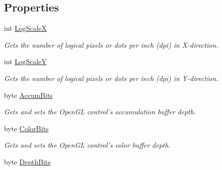 \subsection*{Properties}
\begin{DoxyCompactItemize}
\item 
int \hyperlink{class_tao_1_1_platform_1_1_windows_1_1_simple_open_gl_control_ab14fda5344aa34eca23541070aa7f85a}{LogScaleX}
\begin{DoxyCompactList}\small\item\em Gets the number of logical pixels or dots per inch (dpi) in X-\/direction. \item\end{DoxyCompactList}\item 
int \hyperlink{class_tao_1_1_platform_1_1_windows_1_1_simple_open_gl_control_a505290cb6af53a7ca7829627ba5177e2}{LogScaleY}
\begin{DoxyCompactList}\small\item\em Gets the number of logical pixels or dots per inch (dpi) in Y-\/direction. \item\end{DoxyCompactList}\item 
byte \hyperlink{class_tao_1_1_platform_1_1_windows_1_1_simple_open_gl_control_abcad872d44f34b54788b6d4df63731c9}{AccumBits}
\begin{DoxyCompactList}\small\item\em Gets and sets the OpenGL control's accumulation buffer depth. \item\end{DoxyCompactList}\item 
byte \hyperlink{class_tao_1_1_platform_1_1_windows_1_1_simple_open_gl_control_ab1f846be9a246005878d9309bd53c629}{ColorBits}
\begin{DoxyCompactList}\small\item\em Gets and sets the OpenGL control's color buffer depth. \item\end{DoxyCompactList}\item 
byte \hyperlink{class_tao_1_1_platform_1_1_windows_1_1_simple_open_gl_control_a3956619c7ebd2b05882aa0ee26534281}{DepthBits}

\end{DoxyCompactItemize}
